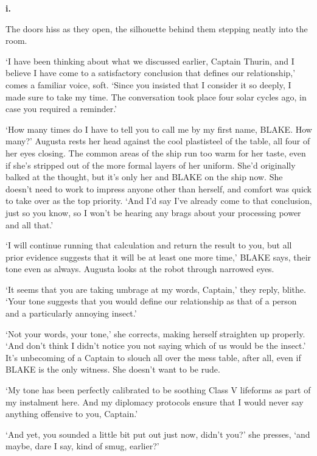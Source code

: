 ﻿

\textbf{i.}

The doors hiss as they open, the silhouette behind them stepping
neatly into the room.

`I have been thinking about what we discussed earlier, Captain Thurin,
and I believe I have come to a satisfactory conclusion that defines
our relationship,' comes a familiar voice, soft. `Since you insisted
that I consider it so deeply, I made sure to take my time. The
conversation took place four solar cycles ago, in case you required a
reminder.'

`How many times do I have to tell you to call me by my first name,
BLAKE. How many?' Augusta rests her head against the cool plastisteel
of the table, all four of her eyes closing. The common areas of the
ship run too warm for her taste, even if she's stripped out of the
more formal layers of her uniform. She'd originally balked at the
thought, but it's only her and BLAKE on the ship now. She doesn't need
to work to impress anyone other than herself, and comfort was quick to
take over as the top priority. `And I'd say I've already come to that
conclusion, just so you know, so I won't be hearing any brags about
your processing power and all that.'

`I will continue running that calculation and return the result to
you, but all prior evidence suggests that it will be at least one more
time,' BLAKE says, their tone even as always. Augusta looks at the
robot through narrowed eyes.

`It seems that you are taking umbrage at my words, Captain,' they
reply, blithe. `Your tone suggests that you would define our
relationship as that of a person and a particularly annoying insect.'

`Not your words, your tone,' she corrects, making herself straighten
up properly. `And don't think I didn’t notice you not saying which of
us would be the insect.' It’s unbecoming of a Captain to slouch all
over the mess table, after all, even if BLAKE is the only witness. She
doesn't want to be rude.

`My tone has been perfectly calibrated to be soothing Class V
lifeforms as part of my instalment here. And my diplomacy protocols
ensure that I would never say anything offensive to you, Captain.'

`And yet, you sounded a little bit put out just now, didn’t you?' she
presses, `and maybe, dare I say, kind of smug, earlier?'

